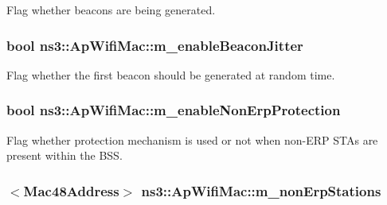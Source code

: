 Flag whether beacons are being generated. 

\subsubsection[{\texorpdfstring{m\+\_\+enable\+Beacon\+Jitter}{m_enableBeaconJitter}}]{\setlength{\rightskip}{0pt plus 5cm}bool ns3\+::\+Ap\+Wifi\+Mac\+::m\+\_\+enable\+Beacon\+Jitter\hspace{0.3cm}{\ttfamily [private]}}\hypertarget{classns3_1_1ApWifiMac_a803812db18b44720f24e48140e0f0c1e}{}\label{classns3_1_1ApWifiMac_a803812db18b44720f24e48140e0f0c1e}


Flag whether the first beacon should be generated at random time. 

\subsubsection[{\texorpdfstring{m\+\_\+enable\+Non\+Erp\+Protection}{m_enableNonErpProtection}}]{\setlength{\rightskip}{0pt plus 5cm}bool ns3\+::\+Ap\+Wifi\+Mac\+::m\+\_\+enable\+Non\+Erp\+Protection\hspace{0.3cm}{\ttfamily [private]}}\hypertarget{classns3_1_1ApWifiMac_a3f18f344b2eefe6357790600df8c4d23}{}\label{classns3_1_1ApWifiMac_a3f18f344b2eefe6357790600df8c4d23}


Flag whether protection mechanism is used or not when non-\/\+E\+RP S\+T\+As are present within the B\+SS. 

\subsubsection[{\texorpdfstring{m\+\_\+non\+Erp\+Stations}{m_nonErpStations}}]{$<${\bf Mac48\+Address}$>$ ns3\+::\+Ap\+Wifi\+Mac\+::m\+\_\+non\+Erp\+Stations\hspace{0.3cm}{\ttfamily [private]}}\hypertarget{classns3_1_1ApWifiMac_a0f928a5ab62fc090a939a26ac3675caf}{}\label{classns3_1_1ApWifiMac_a0f928a5ab62fc090a939a26ac3675caf}


